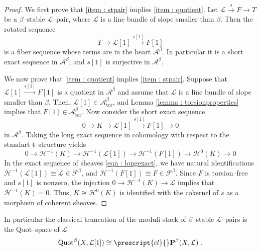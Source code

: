 \documentclass[11pt]{article}
\newcommand{\fbeta}{\mathcal{F}^{\beta}}
\newcommand{\abeta}{\mathcal{A}^{\beta}}
\newcommand{\abetator}{\mathcal{A}^{\beta}_{\operatorname{tor}}}
\newcommand{\linebundle}{\mathcal{L}}
\newcommand{\pairslb}{\boldsymbol{\operatorname{P}}^{\beta}(X,\mathcal{L})}
\newcommand{\Quotbetaone}{\operatorname{Quot}^{\beta}(X,\mathcal{L}[1])}
\begin{document}
    \begin{proof} We first prove that \ref{item : stpair} implies \ref{item : quotient}. Let $\linebundle \xrightarrow{s} F\rightarrow T$ be a $\beta$--stable $\linebundle$--pair, where $\linebundle$ is a line bundle of slope smaller than $\beta$. Then the rotated sequence
    \[
        T \rightarrow \linebundle[1] \xrightarrow{s[1]} F[1]
    \]
    is a fiber sequence whose terms are in the heart $\abeta$. In particular it is a short exact sequence in $\abeta$, and $s[1]$ is surjective in $\abeta$.

    \medskip
    
    \noindent We now prove that \ref{item : quotient} implies \ref{item : stpair}. Suppose that $\linebundle[1] \xrightarrow{s[1]}F[1]$ is a quotient in $\abeta$ and assume that $\linebundle$ is a line bundle of slope smaller than $\beta$. Then, $\linebundle[1] \in \abetator$, and Lemma \ref{lemma : torsionproperties} implies that $F[1]\in \abetator$. Now consider the short exact sequence
    \begin{equation}
        0\rightarrow K \rightarrow \linebundle[1] \xrightarrow{s[1]}F[1]\rightarrow 0
    \end{equation}
    in $\abeta$. Taking the long exact sequence in cohomology with respect to the standart t--structure yields
    \begin{equation}\label{eqn : longexact}
        0\rightarrow\mathcal{H}^{-1}(K) \rightarrow \mathcal{H}^{-1}(\linebundle[1]) \rightarrow \mathcal{H}^{-1}(F[1]) \rightarrow \mathcal{H}^0(K) \rightarrow0
    \end{equation}
    In the exact sequence of sheaves \eqref{eqn : longexact}, we have natural identifications $\mathcal{H}^{-1}(\linebundle[1]) \cong \linebundle \in \fbeta$, and $\mathcal{H}^{-1}(F[1]) \cong F \in \fbeta$. Since $F$ is torsion--free and $s[1]$ is nonzero, the injection $0\rightarrow\mathcal{H}^{-1}(K) \rightarrow \linebundle$ implies that $\mathcal{H}^{-1}(K)=0$. Thus, $K \cong \mathcal{H}^0(K)$ is identified with the cokernel of $s$ as a morphism of coherent sheaves.
    \end{proof}
\noindent In particular the classical truncation of the moduli stack of $\beta$--stable $\linebundle$--pairs is the Quot--space of $\linebundle$
\begin{equation}\label{eqn : QuotPairs}
        \Quotbetaone \cong \prescript{cl}{}\pairslb\ .
\end{equation}

\bigskip
\end{document}
